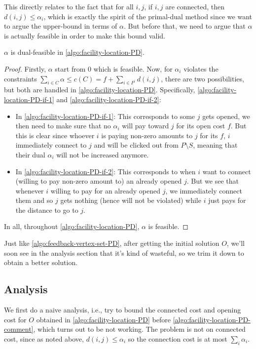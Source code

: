 This directly relates to the fact that for all \(i, j\), if \(i, j\) are connected, then \(d(i, j) \leq \alpha _i\), which is exactly the spirit of the primal-dual method since we want to argue the upper-bound in terms of \(\alpha\). But before that, we need to argue that \(\alpha \) is actually feasible in order to make this bound valid.

\begin{lemma}
	\(\alpha \) is dual-feasible in \autoref{algo:facility-location-PD}.
\end{lemma}
\begin{proof}
	Firstly, \(\alpha\) start from \(0\) which is feasible. Now, for \(\alpha _i\) violates the constraints \(\sum_{i\in C} \alpha \leq c(C) = f + \sum_{i\in P^\prime }d(i, j)\), there are two possibilities, but both are handled in \autoref{algo:facility-location-PD}. Specifically, \autoref{algo:facility-location-PD-if-1} and \autoref{algo:facility-location-PD-if-2}:
	\begin{itemize}
		\item In \autoref{algo:facility-location-PD-if-1}: This corresponds to some \(j\) gets opened, we then need to make sure that no \(\alpha _i\) will pay toward \(j\) for its open cost \(f\). But this is clear since whoever \(i\) is paying non-zero amounts to \(j\) for its \(f\), \(i\) immediately connect to \(j\) and will be clicked out from \(P\setminus S\), meaning that their dual \(\alpha _i\) will not be increased anymore.
		\item In \autoref{algo:facility-location-PD-if-2}: This corresponds to when \(i\) want to connect (willing to pay non-zero amount to) an already opened \(j\). But we see that whenever \(i\) willing to pay for an already opened \(j\), we immediately connect them and so \(j\) gets nothing (hence will not be violated) while \(i\) just pays for the distance to go to \(j\).
	\end{itemize}
	In all, throughout \autoref{algo:facility-location-PD}, \(\alpha \) is feasible.
\end{proof}

\begin{note}
	Just like \autoref{algo:feedback-vertex-set-PD}, after getting the initial solution \(O\), we'll soon see in the analysis section that it's kind of wasteful, so we trim it down to obtain a better solution.
\end{note}

\subsection{Analysis}
We first do a naive analysis, i.e., try to bound the connected cost and opening cost for \(O\) obtained in \autoref{algo:facility-location-PD} before \autoref{algo:facility-location-PD-comment}, which turns out to be not working. The problem is not on connected cost, since as noted above, \(d(i, j) \leq \alpha _i\) so the connection cost is at most \(\sum_{i} \alpha _i\).

